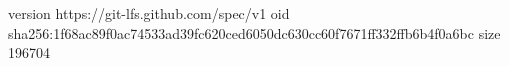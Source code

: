 version https://git-lfs.github.com/spec/v1
oid sha256:1f68ac89f0ac74533ad39fc620ced6050dc630cc60f7671ff332ffb6b4f0a6bc
size 196704
